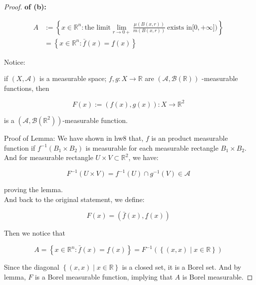 \begin{proof}

\textbf{of (b):}

\[\begin{matrix}
A & {:= \left\{ {x \in \mathbb{R}^{n}:\text{the limit}\lim\limits_{r\rightarrow 0 +}\frac{\mu(B(x,r))}{m(B(x,r))}\ \text{exists in}\lbrack 0, + \infty\rbrack\text{)}} \right\}} \\
 & {= \left\{ {x \in \mathbb{R}^{n}:\bar{f}(x) = \underline{f}(x)} \right\}}
\end{matrix}\]

Notice:

\begin{lemma}

if \((X,\mathcal{A})\) is a measurable space; \(f,g:X\rightarrow\mathbb{R}\) are \((\mathcal{A},\mathcal{B}(\mathbb{R}))\) -measurable functions, then

\[F(x) := (f(x),g(x)):X\rightarrow\mathbb{R}^{2}\]

is a \((\mathcal{A},\mathcal{B}(\mathbb{R}^{2}))\)-measurable function.

\end{lemma}

Proof of Lemma: We have shown in hw8 that, \(f\) is an product measurable function if \(f^{- 1}\left( {B_{1} \times B_{2}} \right)\) is measurable for each measurable rectangle \(B_{1} \times B_{2}\).\\
And for measurable rectangle \(U \times V \subset \mathbb{R}^{2}\), we have:

\[F^{- 1}(U \times V) = f^{- 1}(U) \cap g^{- 1}(V) \in \mathcal{A}\]

proving the lemma.\\
And back to the original statement, we define:

\[F(x) = (\bar{f}(x),\underline{f}(x))\]

Then we notice that

\[A = \left\{ {x \in \mathbb{R}^{n}:\bar{f}(x) = \underline{f}(x)} \right\} = F^{- 1}(\left\{ (x,x) \middle| x \in \mathbb{R} \right\})\]

Since the diagonal \(\left\{ (x,x) \middle| x \in \mathbb{R} \right\}\) is a closed set, it is a Borel set. And by lemma, \(F\) is a Borel measurable function, implying that \(A\) is Borel measurable.

\end{proof}

